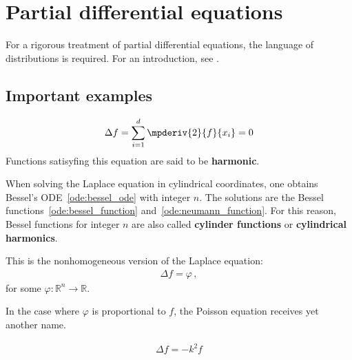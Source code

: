 \chapter{Partial differential equations}\label{chapter:pde}

    For a rigorous treatment of partial differential equations, the language of distributions is required. For an introduction, see .

    \minitoc

\section{Important examples}

    \begin{example}\label{pde:laplace_equation}
        \begin{gather}
            \Delta f = \sum_{i=1}^d\mpderiv{2}{f}{x_i}=0
        \end{gather}
        Functions satisyfing this equation are said to be \textbf{harmonic}.
    \end{example}

    When solving the Laplace equation in cylindrical coordinates, one obtains Bessel's ODE~\eqref{ode:bessel_ode} with integer $n$. The solutions are the Bessel functions~\eqref{ode:bessel_function} and~\eqref{ode:neumann_function}. For this reason, Bessel functions for integer $n$ are also called \textbf{cylinder functions} or \textbf{cylindrical harmonics}.

    \begin{example}
        This is the nonhomogeneous version of the Laplace equation:
        \begin{gather}
            \Delta f = \varphi\,,
        \end{gather}
        for some $\varphi:\mathbb{R}^n\rightarrow\mathbb{R}$.
    \end{example}

    In the case where $\varphi$ is proportional to $f$, the Poisson equation receives yet another name.
    \begin{example}\label{pde:helmholtz_equation}
        \begin{gather}
            \Delta f = -k^2f
        \end{gather}
    \end{example}

